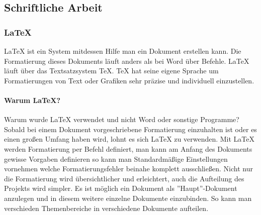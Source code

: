 \subsection{Schriftliche Arbeit}
\label{sec:TechSchriftlicheArbeit}
\subsubsection {LaTeX}
\label{sec:LaTeX}
LaTeX ist ein System mitdessen Hilfe man ein Dokument erstellen kann. Die Formatierung dieses Dokuments läuft anders als bei Word über Befehle. LaTeX läuft über das Textsatzsystem TeX. TeX hat seine eigene Sprache um Formatierungen von Text oder Grafiken sehr präzise und individuell einzustellen. 
\paragraph{Warum LaTeX?}
\label{sec:WarumLaTeX}
Warum wurde LaTeX verwendet und nicht Word oder sonstige Programme? Sobald bei einem Dokument vorgeschriebene Formatierung einzuhalten ist oder es einen großen Umfang haben wird, lohnt es sich LaTeX zu verwenden. Mit LaTeX werden Formatierung per Befehl definiert, man kann am Anfang des Dokuments gewisse Vorgaben definieren so kann man Standardmäßige Einstellungen vornehmen welche Formatierungsfehler beinahe komplett ausschließen. Nicht nur die Formatierung wird übersichtlicher und erleichtert, auch die Aufteilung des Projekts wird simpler. Es ist möglich ein Dokument als ''Haupt''-Dokument anzulegen und in diesem weitere einzelne Dokumente einzubinden. So kann man verschieden Themenbereiche in verschiedene Dokumente aufteilen. \cite{TechnologieLaTeX} 
\pagebreak